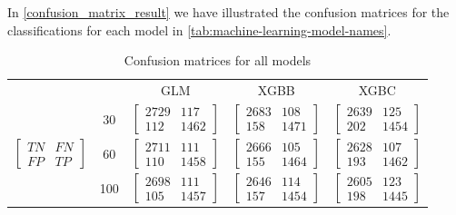 In \autoref{confusion_matrix_result} we have illustrated the confusion matrices for the classifications for each model in \autoref{tab:machine-learning-model-names}. 
\begin{table}[H]
\centering
\begin{tabular}{lcccc}
& & GLM & XGBB & XGBC \\
\vspace{1em}
&30 & $\begin{bmatrix} 2729   & 117 \\ 112  & 1462 \end{bmatrix}$ & 
    $\begin{bmatrix} 2683     &  108 \\ 158  &  1471 \end{bmatrix}$ & 
    $\begin{bmatrix} 2639     & 125  \\ 202    &  1454 \end{bmatrix}$\\
\vspace{1em}
$\begin{bmatrix} TN   & FN  \\ FP   &  TP \end{bmatrix}$ & 60 & $\begin{bmatrix} 2711   & 111  \\ 110   &  1458 \end{bmatrix}$ & 
    $\begin{bmatrix} 2666      & 105  \\ 155  &  1464 \end{bmatrix}$ & 
    $\begin{bmatrix} 2628       &  107 \\ 193    & 1462  \end{bmatrix}$  \\
\vspace{1em}
&100 & $\begin{bmatrix} 2698     &  111 \\ 105    &1457  \end{bmatrix}$ & 
     $\begin{bmatrix} 2646   & 114 \\157    & 1454  \end{bmatrix}$ & 
     $\begin{bmatrix} 2605     & 123 \\ 198    &1445  \end{bmatrix}$ \\

\end{tabular}
\vspace{1em}
\caption{{Confusion matrices for all models}}
\label{confusion_matrix_result}
\end{table}

